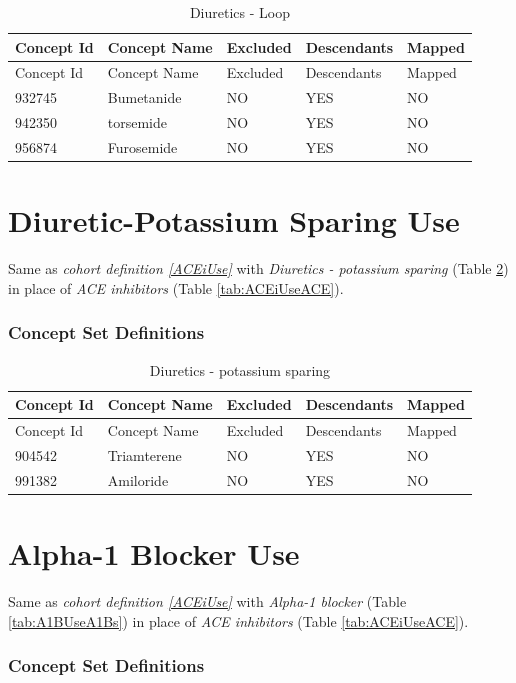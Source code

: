 \documentclass[11pt]{book}
\theoremstyle{definition}
\theoremstyle{definition}
\theoremstyle{definition}
\theoremstyle{remark}
\begin{document}
\begin{longtable}[]{@{}lllll@{}}
\caption{\label{tab:DLoopUseDLoops} Diuretics - Loop}\tabularnewline
\toprule
Concept Id & Concept Name & Excluded & Descendants &
Mapped\tabularnewline
\midrule
\endfirsthead
\toprule
Concept Id & Concept Name & Excluded & Descendants &
Mapped\tabularnewline
\midrule
\endhead
932745 & Bumetanide & NO & YES & NO\tabularnewline
942350 & torsemide & NO & YES & NO\tabularnewline
956874 & Furosemide & NO & YES & NO\tabularnewline
\bottomrule
\end{longtable}

\section{Diuretic-Potassium Sparing Use}\label{DPUse}

Same as \emph{cohort definition \ref{ACEiUse}} with \emph{Diuretics -
potassium sparing} (Table \ref{tab:DPUseDPs}) in place of \emph{ACE
inhibitors} (Table \ref{tab:ACEiUseACE}).

\subsubsection*{Concept Set
Definitions}\label{concept-set-definitions-13}

\begin{longtable}[]{@{}lllll@{}}
\caption{\label{tab:DPUseDPs} Diuretics - potassium sparing}\tabularnewline
\toprule
Concept Id & Concept Name & Excluded & Descendants &
Mapped\tabularnewline
\midrule
\endfirsthead
\toprule
Concept Id & Concept Name & Excluded & Descendants &
Mapped\tabularnewline
\midrule
\endhead
904542 & Triamterene & NO & YES & NO\tabularnewline
991382 & Amiloride & NO & YES & NO\tabularnewline
\bottomrule
\end{longtable}

\section{Alpha-1 Blocker Use}\label{A1BUse}

Same as \emph{cohort definition \ref{ACEiUse}} with \emph{Alpha-1
blocker} (Table \ref{tab:A1BUseA1Bs}) in place of \emph{ACE inhibitors}
(Table \ref{tab:ACEiUseACE}).

\subsubsection*{Concept Set
Definitions}\label{concept-set-definitions-14}
\end{document}
